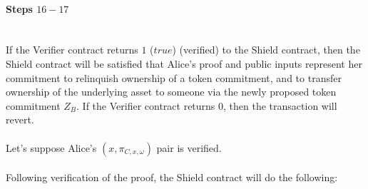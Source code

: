 \documentclass{article}
\begin{document}
\paragraph{Steps $16 - 17$}
\ \\
If the Verifier contract returns $1$ ($true$) (verified) to the Shield contract, then the Shield contract will be satisfied that Alice's proof and public inputs represent her commitment to relinquish ownership of a token commitment, and to transfer ownership of the underlying asset to someone via the newly proposed token commitment $Z_B$. If the Verifier contract returns $0$, then the transaction will revert.\\
\\
Let's suppose Alice's $(x, \pi_{C,x,\omega})$ pair is verified.\\
\\
Following verification of the proof, the Shield contract will do the following:
\end{document}
